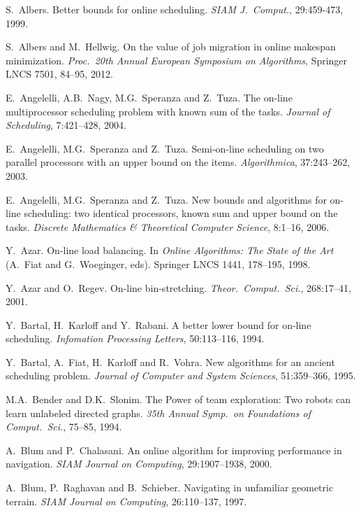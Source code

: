 \documentclass{llncs}
\begin{document}
\begin{thebibliography}{10}
\setlength{\itemsep}{0pt plus .3pt}
\setlength{\parsep}{0pt plus .3pt}
\setlength{\parskip}{0pt plus .3pt}

S.~Albers. Better bounds for online scheduling. {\em SIAM J.\ Comput.},
29:459-473, 1999. 

S.\ Albers and M.\ Hellwig. On the value of job migration in online makespan minimization.
{\em Proc.\ 20th Annual European Symposium on Algorithms}, Springer LNCS 7501, 84--95, 2012.

E.\ Angelelli, A.B.\ Nagy, M.G.\ Speranza and Z.\ Tuza. The on-line multiprocessor scheduling
problem with known sum of the tasks. {\em Journal of Scheduling\/},  7:421--428, 2004.

E.\ Angelelli, M.G.\ Speranza and Z.\ Tuza. Semi-on-line scheduling on two parallel processors 
with an upper bound on the items. {\em Algorithmica\/}, 37:243--262, 2003.

E.\ Angelelli, M.G.\ Speranza and Z.\ Tuza. New bounds and algorithms for on-line scheduling: two 
identical processors, known sum and upper bound on the tasks. {\em Discrete Mathematics \& Theoretical 
Computer Science\/},  8:1--16, 2006.

Y.\ Azar. On-line load balancing. In {\em Online Algorithms: The State of the Art\/} (A.\ Fiat and
G.\ Woeginger, eds). Springer LNCS 1441, 178--195, 1998.

Y.\ Azar and O.\ Regev. On-line bin-stretching. {\em Theor.\ Comput.\ Sci.\/},
268:17--41, 2001.

Y.\ Bartal, H.\ Karloff and Y.\ Rabani. A better lower bound for on-line
scheduling. {\em Infomation Processing Letters}, 50:113--116, 1994.

Y.~Bartal, A.~Fiat, H.~Karloff and R.~Vohra. New algorithms for an 
ancient scheduling problem. {\em Journal of Computer and System
Sciences}, 51:359--366, 1995.

M.A.\ Bender and D.K.\ Slonim. The Power of team exploration: Two robots can learn unlabeled directed graphs. 
{\em 35th Annual Symp.\ on Foundations of Comput.\ Sci.\/}, 75--85, 1994.

A.\ Blum and P.\ Chalasani. An online algorithm for improving performance in navigation. 
{\em SIAM Journal on Computing\/}, 29:1907--1938, 2000.

A.\ Blum, P.\ Raghavan and B.\ Schieber. Navigating in unfamiliar geometric terrain. 
{\em SIAM Journal on Computing\/}, 26:110--137, 1997.


\end{thebibliography}
\end{document}
